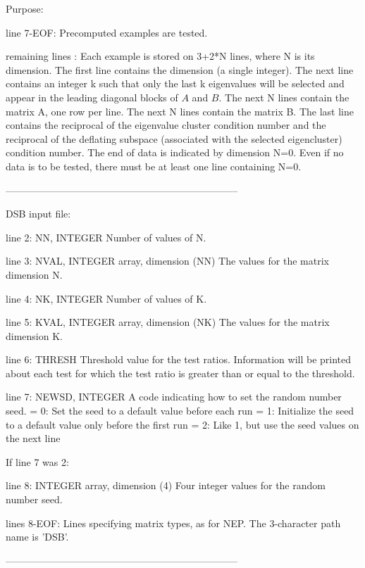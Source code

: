 \begin{DoxyParagraph}{Purpose\+: }
\begin{DoxyVerb}
 line 7-EOF: Precomputed examples are tested.

 remaining lines : Each example is stored on 3+2*N lines, where N is
          its dimension. The first line contains the dimension (a
          single integer).  The next line contains an integer k such
          that only the last k eigenvalues will be selected and appear
          in the leading diagonal blocks of $A$ and $B$. The next N
          lines contain the matrix A, one row per line.  The next N
          lines contain the matrix B.  The last line contains the
          reciprocal of the eigenvalue cluster condition number and the
          reciprocal of the deflating subspace (associated with the
          selected eigencluster) condition number.  The end of data is
          indicated by dimension N=0.  Even if no data is to be tested,
          there must be at least one line containing N=0.

-----------------------------------------------------------------------

 DSB input file:

 line 2:  NN, INTEGER
          Number of values of N.

 line 3:  NVAL, INTEGER array, dimension (NN)
          The values for the matrix dimension N.

 line 4:  NK, INTEGER
          Number of values of K.

 line 5:  KVAL, INTEGER array, dimension (NK)
          The values for the matrix dimension K.

 line 6:  THRESH
          Threshold value for the test ratios.  Information will be
          printed about each test for which the test ratio is greater
          than or equal to the threshold.

 line 7:  NEWSD, INTEGER
          A code indicating how to set the random number seed.
          = 0:  Set the seed to a default value before each run
          = 1:  Initialize the seed to a default value only before the
                first run
          = 2:  Like 1, but use the seed values on the next line

 If line 7 was 2:

 line 8:  INTEGER array, dimension (4)
          Four integer values for the random number seed.

 lines 8-EOF:  Lines specifying matrix types, as for NEP.
          The 3-character path name is 'DSB'.

-----------------------------------------------------------------------


\end{DoxyVerb}
\end{DoxyParagraph}
